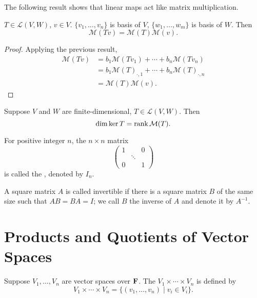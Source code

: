 The following result shows that linear maps act like matrix multiplication.

\begin{proposition}
$T\in\mathcal{L}(V,W)$, $v\in V$. $\{v_1,\dots,v_n\}$ is basis of $V$, $\{w_1,\dots,w_m\}$ is basis of $W$. Then
\[\mathcal{M}(Tv)=\mathcal{M}(T)\mathcal{M}(v).\]
\end{proposition}

\begin{proof}
Applying the previous result,
\begin{align*}
\mathcal{M}(Tv)&=b_1\mathcal{M}(Tv_1)+\cdots+b_n\mathcal{M}(Tv_n)\\
&=b_1\mathcal{M}(T)_{\cdot,1}+\cdots+b_n\mathcal{M}(T)_{\cdot,n}\\
&=\mathcal{M}(T)\mathcal{M}(v).
\end{align*}
\end{proof}

\begin{proposition}
Suppose $V$ and $W$ are finite-dimensional, $T\in\mathcal{L}(V,W)$. Then
\[\dim\ker T=\rank \mathcal{M}(T).\]
\end{proposition}

\begin{definition}
For positive integer $n$, the $n\times n$ matrix
\[\begin{pmatrix}
1&&0\\
&\ddots&\\
0&&1
\end{pmatrix}\]
is called the , denoted by $I_n$.
\end{definition}

\begin{definition}[Invertibility]
A square matrix $A$ is called invertible if there is a square matrix $B$ of the same size such that $AB=BA=I$; we call $B$ the inverse of $A$ and denote it by $A^{-1}$.
\end{definition}

\section{Products and Quotients of Vector Spaces}
\begin{definition}[Product]
Suppose $V_1,\dots,V_n$ are vector spaces over $\mathbf F$. The  $V_1\times\cdots\times V_n$ is defined by
\[V_1\times\cdots\times V_n=\{(v_1,\dots,v_n)\mid v_i\in V_i\}.\]
\end{definition}

